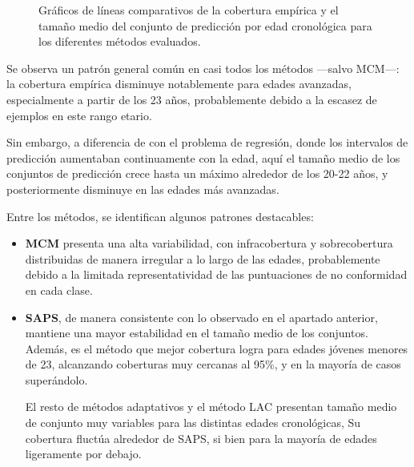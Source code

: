 \begin{figure}[htbp]
    \caption[
        Gráficos de líneas comparativos de la cobertura empírica y el tamaño medio del conjunto de predicción por edad cronológica para los diferentes métodos evaluados.
    ]{
        Gráficos de líneas comparativos de la cobertura empírica y el tamaño medio del conjunto de predicción por edad cronológica para los diferentes métodos evaluados.
    }
    \label{fig:AGC_EC_MPSS_by_true_age}
\end{figure}

Se observa un patrón general común en casi todos los métodos ---salvo MCM---: la cobertura empírica disminuye notablemente para edades avanzadas, especialmente a partir de los 23 años, probablemente debido a la escasez de ejemplos en este rango etario.

Sin embargo, a diferencia de con el problema de regresión, donde los intervalos de predicción aumentaban continuamente con la edad, aquí el tamaño medio de los conjuntos de predicción crece hasta un máximo alrededor de los 20-22 años, y posteriormente disminuye en las edades más avanzadas.

Entre los métodos, se identifican algunos patrones destacables:

\begin{itemize}

    \item \textbf{MCM} presenta una alta variabilidad, con infracobertura y sobrecobertura distribuidas de manera irregular a lo largo de las edades, probablemente debido a la limitada representatividad de las puntuaciones de no conformidad en cada clase.
    
    
    \item \textbf{SAPS}, de manera consistente con lo observado en el apartado anterior, mantiene una mayor estabilidad en el tamaño medio de los conjuntos. Además, es el método que mejor cobertura logra para edades jóvenes menores de 23, alcanzando coberturas muy cercanas al 95\%, y en la mayoría de casos superándolo. 
    
    El resto de métodos adaptativos y el método LAC presentan tamaño medio de conjunto muy variables para las distintas edades cronológicas, Su cobertura fluctúa alrededor de SAPS, si bien para la mayoría de edades ligeramente por debajo.
    
\end{itemize}

